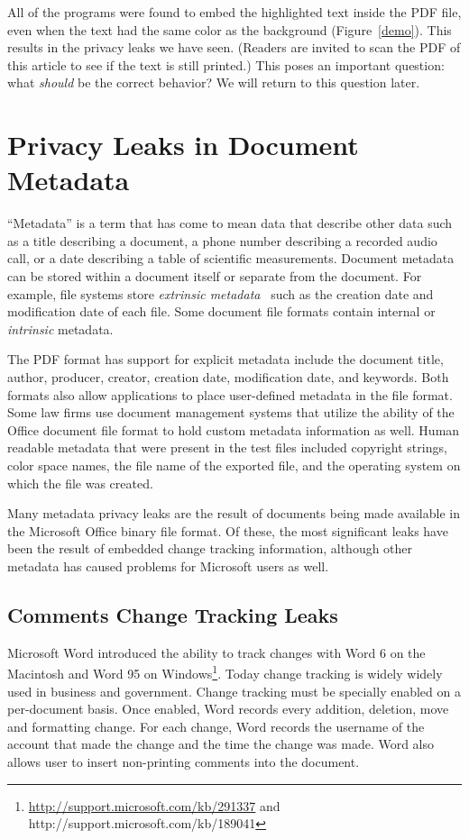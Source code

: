 All of the programs were found to embed the highlighted text inside the
PDF file, even when the text had the same color as the
background (Figure~\ref{demo}). This results in the privacy leaks we
have seen. (Readers are invited to scan the PDF of this article to see
if the text is still printed.) This poses an important
question: what \emph{should} be the correct behavior?  We will return
to this question later.

\section{Privacy Leaks in Document Metadata}

``Metadata'' is a term that has come to mean data that describe other
data such as a title describing a document, a phone number describing
a recorded audio call, or a date describing a table of scientific measurements. Document metadata can be stored within a document itself
or separate from the document. For example, file systems store
\emph{extrinsic metadata}~\cite{garfinkel:ascription} such as the
creation date and modification date of each file. Some document file
formats contain internal or \emph{intrinsic} metadata. 

The PDF format has support for explicit metadata include the document
title, author, producer, creator, creation date, modification date,
and keywords. Both formats also allow applications to place
user-defined metadata in the file format. Some law firms use document
management systems that utilize the ability of the Office document
file format to hold custom metadata information as well. Human
readable metadata that were present in the test files included
copyright strings, color space names, the file name of the exported
file, and the operating system on which the file was created.

Many metadata privacy leaks are the result of
documents being made available in the  Microsoft Office binary file
format. Of these, the most significant leaks have been the result of
embedded change tracking information, although other metadata has
caused problems for Microsoft users as well.


\subsection{Comments Change Tracking Leaks}

Microsoft Word introduced the ability to track changes with Word 6 on
the Macintosh and Word 95 on
Windows\footnote{\url{http://support.microsoft.com/kb/291337}
  and http://support.microsoft.com/kb/189041}. Today change
tracking is widely widely used in business and government. Change
tracking must be specially enabled on a per-document basis. Once
enabled, Word records every addition, deletion, move and formatting
change. For each change, Word records the username of the account that
made the change and the time the change was made. Word also allows
user to insert non-printing comments into the document.

